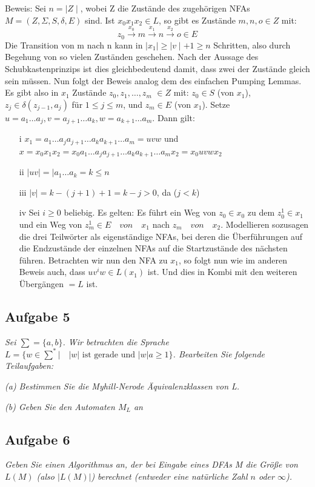 \documentclass[a4paper]{article}
\begin{document}
Beweis: Sei $n=\mid Z\mid$, wobei Z die Zustände des zugehörigen NFAs $M=(Z,\Sigma,S,\delta,E)$ sind. Ist $x_0x_1x_2 \in L$, so gibt es Zustände $m,n,o\in Z$ mit: $$z_0 \xrightarrow{x_0} m \xrightarrow{x_1} n \xrightarrow{x_2} o \in E$$
Die Transition von m nach n kann in $\mid x_1\mid\geq\mid v\mid +1 \geq n$ Schritten, also durch Begehung von so vielen Zuständen geschehen. Nach der Aussage des Schubkastenprinzips ist dies gleichbedeutend damit, dass zwei der Zustände gleich sein müssen. Nun folgt der Beweis analog dem des einfachen Pumping Lemmas.\\
Es gibt also in $x_1$ Zustände $z_0,z_1,…,z_m$ $\in Z$ mit: $z_0\in S$ (von $x_1$), $z_j \in \delta(z_{j-1},a_j)$ für $1\leq j\leq m$, und $z_m\in E$ (von $x_1$).
Setze $u = a_1 … a_j, v = a_{j+1}…a_k, w=a_{k+1}…a_m$.
Dann gilt:
\begin{itemize}
    \item[i] $x_1 = a_1…a_ja_{j+1}…a_ka_{k+1}…a_m = uvw$ und $x=x_0x_1x_2 = x_0a_1…a_ja_{j+1}…a_ka_{k+1}…a_mx_2 = x_0uvwx_2$
    \item[ii] $\mid uv\mid=\mid a_1…a_k = k \leq n$
    \item[iii] $\mid v\mid = k -(j+1)+1 = k-j > 0$, da ($j < k$)
    \item[iv] Sei $i\geq 0$ beliebig. Es gelten:
          Es führt ein Weg von $z_0\in x_0$ zu dem $z_0^1 \in x_1$ und ein Weg von $z_m^1 \in E \quad von \quad x_1$ nach $z_m \quad von \quad x_2$. Modellieren sozusagen die drei Teilwörter als eigenständige NFAs, bei deren die Überführungen auf die Endzustände der einzelnen NFAs auf die Startzustände des nächsten führen. Betrachten wir nun den NFA zu $x_1$, so folgt nun wie im anderen Beweis auch, dass $uv^iw \in L(x_1)$ ist. Und dies in Kombi mit den weiteren Übergängen $=L$ ist.
\end{itemize}

\subsection{Aufgabe 5}
\textit{Sei $\sum=\{a, b\}$. Wir betrachten die Sprache $L=\{w\in\sum^*\vert\quad |w| \text{ ist gerade und } |w| a \geq 1\}$. Bearbeiten Sie folgende Teilaufgaben:}

\textit{(a) Bestimmen Sie die Myhill-Nerode Äquivalenzklassen von L.}

\textit{(b) Geben Sie den Automaten $M_L$ an}

\subsection{Aufgabe 6}
\textit{Geben Sie einen Algorithmus an, der bei Eingabe eines DFAs M die Größe von $L(M)$ (also $|L(M)|$) berechnet (entweder eine natürliche Zahl $n$ oder $\infty$).}
\end{document}
